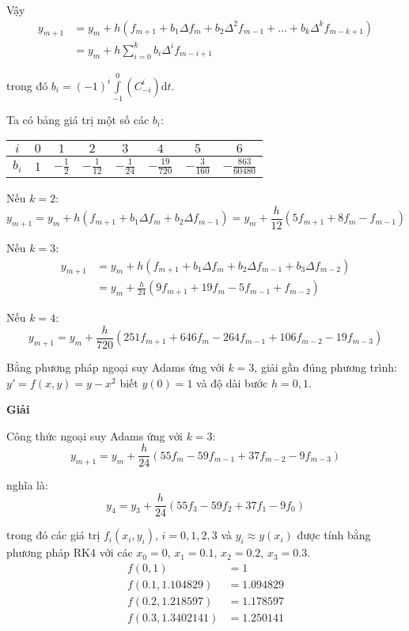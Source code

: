 Vậy
\begin{align*}
	y_{m+1}&=y_m+h(f_{m+1}+b_1 \Delta f_m+b_2 \Delta^2 f_{m-1}+\ldots+b_k \Delta^k f_{m-k+1})\\
	       &=y_m+h\sum\limits_{i=0}^{k} b_i\Delta^i f_{m-i+1}
\end{align*}

trong đó $b_i=(-1)^i\int\limits_{-1}^{0} \left(C_{-i}^i\right)\mathrm{d}t$.\par

Ta có bảng giá trị một số các $b_i$:
\begin{center}\begin{tabular}{|c|c|c|c|c|c|c|c|}\hline
	$i$   & $0$ & $1$        & $2$             & $3$             & $4$               & $5$              & $6$\\\hline
	\tabularrowheight{24pt}
	$b_i$ & $1$ & $-\frac12$ & $-\frac{1}{12}$ & $-\frac{1}{24}$ & $-\frac{19}{720}$ & $-\frac{3}{160}$ & $-\frac{863}{60480}$\\\hline
\end{tabular}\end{center}

Nếu $k=2$:
$$y_{m+1}=y_m+h(f_{m+1}+b_1\Delta f_m+b_2\Delta f_{m-1})=y_m+\frac{h}{12}(5f_{m+1}+8f_m-f_{m-1})$$

Nếu $k=3$:
\begin{align*}
	y_{m+1}&=y_m+h(f_{m+1}+b_1\Delta f_m+b_2\Delta f_{m-1}+b_3\Delta f_{m-2})\\
	       &=y_m+\frac{h}{24}(9f_{m+1}+19f_m-5f_{m-1}+f_{m-2})
\end{align*}

Nếu $k=4$:
$$y_{m+1}=y_m+\frac{h}{720}(251f_{m+1}+646f_m-264f_{m-1}+106f_{m-2}-19f_{m-3})$$

\begin{example}
Bằng phương pháp ngoại suy Adams ứng với $k=3$, giải gần đúng phương trình: $y'=f(x,y)=y-x^2$ biết $y(0)=1$ và độ dài bước $h=0,1$.
\end{example}

\textbf{Giải}\par
Công thức ngoại suy Adams ứng với $k=3$:\\
$$y_{m+1}=y_m+\frac{h}{24} (55f_m-59f_{m-1}+37f_{m-2}-9f_{m-3})$$

nghĩa là:
$$y_4=y_3+\frac{h}{24} (55f_3-59f_2+37f_1-9f_0)$$

trong đó các giá trị $f_i(x_i,y_i)$, $i=0,1,2,3$ và $y_i\approx y(x_i)$ được tính bằng phương pháp RK4 với các $x_0=0$, $x_1=0.1$, $x_2=0.2$, $x_3=0.3$.
\begin{align*}
	f(0,1)          &=1\\
	f(0.1,1.104829) &=1.094829\\
	f(0.2,1.218597) &=1.178597\\
	f(0.3,1.3402141)&=1.250141
\end{align*}

